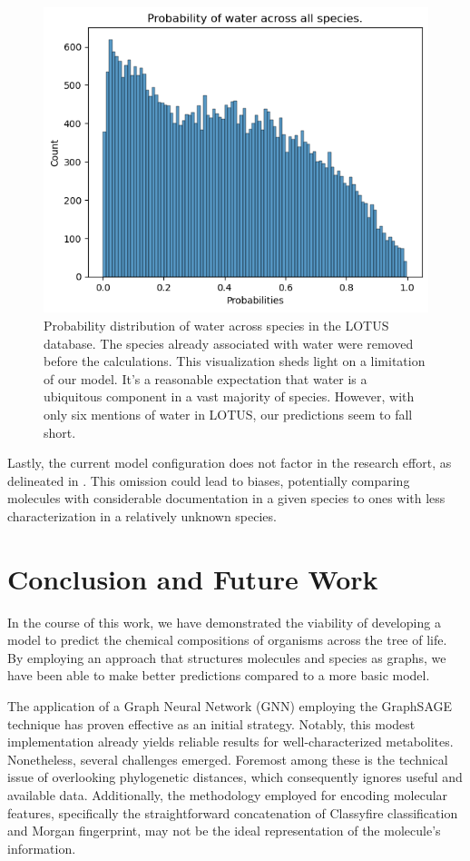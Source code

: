 \documentclass[
11pt, %
oneside, %
english, %
singlespacing, %
headsepline, %
chapterinoneline, %
]{MastersDoctoralThesis} %
\begin{document}
\begin{figure}[h]
	\centering
	\includegraphics[scale=0.7]{figure/water}
	\caption{Probability distribution of water across species in the LOTUS database. The species already associated with water were removed before the calculations. This visualization sheds light on a limitation of our model. It's a reasonable expectation that water is a ubiquitous component in a vast majority of species. However, with only six mentions of water in LOTUS, our predictions seem to fall short.}
	\label{fig: water probabilities}
\end{figure}

Lastly, the current model configuration does not factor in the research effort, as delineated in . This omission could lead to biases, potentially comparing molecules with considerable documentation in a given species to ones with less characterization in a relatively unknown species.


\chapter{Conclusion and Future Work}
In the course of this work, we have demonstrated the viability of developing a model to predict the chemical compositions of organisms across the tree of life. By employing an approach that structures molecules and species as graphs, we have been able to make better predictions compared to a more basic model.

The application of a Graph Neural Network (GNN) employing the GraphSAGE technique has proven effective as an initial strategy. Notably, this modest implementation already yields reliable results for well-characterized metabolites. Nonetheless, several challenges emerged. Foremost among these is the technical issue of overlooking phylogenetic distances, which consequently ignores useful and available data. Additionally, the methodology employed for encoding molecular features, specifically the straightforward concatenation of Classyfire classification and Morgan fingerprint, may not be the ideal representation of the molecule's information.
\end{document}
